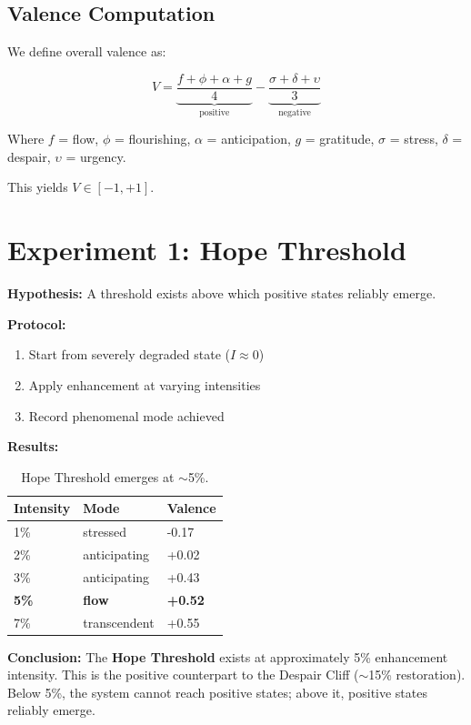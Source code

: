 \documentclass[a4paper,11pt,twocolumn]{article}
\begin{document}
\subsection{Valence Computation}

We define overall valence as:

\begin{equation}
V = \underbrace{\frac{f + \phi + \alpha + g}{4}}_{\text{positive}} - \underbrace{\frac{\sigma + \delta + \upsilon}{3}}_{\text{negative}}
\end{equation}

Where $f$ = flow, $\phi$ = flourishing, $\alpha$ = anticipation, $g$ = gratitude, $\sigma$ = stress, $\delta$ = despair, $\upsilon$ = urgency.

This yields $V \in [-1, +1]$.

\section{Experiment 1: Hope Threshold}

\textbf{Hypothesis:} A threshold exists above which positive states reliably emerge.

\textbf{Protocol:}
\begin{enumerate}
    \item Start from severely degraded state ($I \approx 0$)
    \item Apply enhancement at varying intensities
    \item Record phenomenal mode achieved
\end{enumerate}

\textbf{Results:}

\begin{table}[h]
\centering
\begin{tabular}{@{}lll@{}}
\toprule
Intensity & Mode & Valence \\ \midrule
1\% & stressed & -0.17 \\
2\% & anticipating & +0.02 \\
3\% & anticipating & +0.43 \\
\textbf{5\%} & \textcolor{flowpurple}{\textbf{flow}} & \textbf{+0.52} \\
7\% & transcendent & +0.55 \\
\bottomrule
\end{tabular}
\caption{Hope Threshold emerges at $\sim$5\%.}
\end{table}

\textbf{Conclusion:} The \textbf{Hope Threshold} exists at approximately 5\% enhancement intensity. This is the positive counterpart to the Despair Cliff ($\sim$15\% restoration). Below 5\%, the system cannot reach positive states; above it, positive states reliably emerge.
\end{document}
